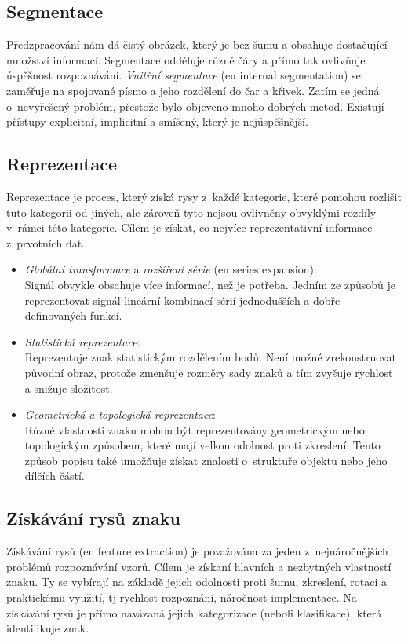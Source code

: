 \documentclass[12pt]{report}			%
\begin{document}
	\subsection{Segmentace}
	\label{sec:extraction}
	Předzpracování nám dá čistý obrázek, který je bez šumu a obsahuje dostačující množství informací. Segmentace odděluje různé čáry a přímo tak ovlivňuje úspěšnost rozpoznávání. \emph{Vnitřní segmentace} (\gls{en} internal segmentation) se zaměřuje na spojované písmo a jeho rozdělení do čar a křivek. Zatím se jedná o~nevyřešený problém, přestože bylo objeveno mnoho dobrých metod. Existují přístupy explicitní, implicitní a smíšený, který je nejúspěšnější.\parencite[\gls{s} 22]{chaudhuri2017optical}
	\subsection{Reprezentace}
	Reprezentace je proces, který získá rysy z~každé kategorie, které pomohou rozlišit tuto kategorii od jiných, ale zároveň tyto nejsou ovlivněny obvyklými rozdíly v~rámci této kategorie. Cílem je získat, co nejvíce reprezentativní informace z~prvotních dat.
	\begin{itemize}
	\item{\emph{Globální transformace} a \emph{rozšíření série} (\gls{en} series expansion):\\Signál obvykle obsahuje více informací, než je potřeba. Jedním ze způsobů je reprezentovat signál lineární kombinací sérií jednodušších a dobře definovaných funkcí.}
	\item{\emph{Statistická reprezentace}:\\ Reprezentuje znak statistickým rozdělením bodů. Není možné zrekonstruovat původní obraz, protože zmenšuje rozměry sady znaků a tím zvyšuje rychlost a snižuje složitost.}
	\item{\emph{Geometrická a topologická reprezentace}: \\Různé vlastnosti znaku mohou být reprezentovány geometrickým nebo topologickým způsobem, které mají velkou odolnost proti zkreslení. Tento způsob popisu také umožňuje získat znalosti o~struktuře objektu nebo jeho dílčích částí.}
	\end{itemize}
	\parencite[\gls{s} 23-28]{chaudhuri2017optical}
	\subsection{Získávání rysů znaku}
	Získávání rysů (\gls{en} feature extraction) je považována za jeden z~nejnáročnějších problémů rozpoznávání vzorů. Cílem je získaní hlavních a nezbytných vlastností znaku. Ty se vybírají na základě jejich odolnosti proti šumu, zkreslení, rotaci a praktickému využití, \gls{tj} rychlost rozpoznání, náročnost implementace. Na získávání rysů je přímo navázaná jejich kategorizace (neboli klasifikace), která identifikuje znak. \parencite[\gls{str} 28-29]{chaudhuri2017optical}
\end{document}
